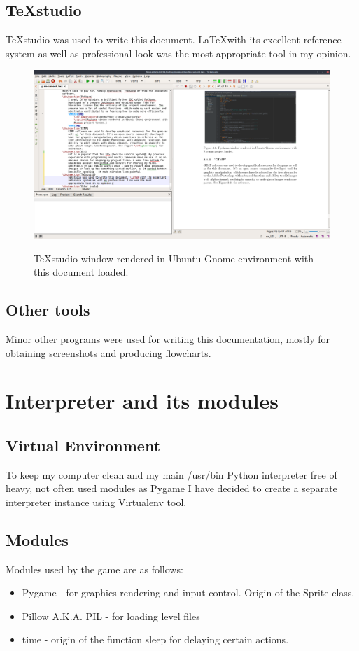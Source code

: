 \documentclass[11pt,a4paper]{report}
\newcommand{\dsubsection}[1]{\FloatBarrier \subsection{#1}}
\newenvironment{img}{
	\begin{center}
		\begin{figure}[H]
			\begin{center}
			
}{
	\end{center}
		\end{figure}
			\end{center}
}
\begin{document}
			\dsubsection{TeXstudio}
				TeXstudio was used to write this document. \LaTeX with its excellent reference system as well as professional look was the most appropriate tool in my opinion.
				\begin{img}
					\includegraphics[width=350pt]{images/texstudio}\\
					\caption{TeXstudio window rendered in Ubuntu Gnome environment with this document loaded.}
				\end{img}
			\dsubsection{Other tools}
				Minor other programs were used for writing this documentation, mostly for obtaining screenshots and producing flowcharts.
		\section{Interpreter and its modules}
			\dsubsection{Virtual Environment}
				To keep my computer clean and my main /usr/bin Python interpreter free of heavy, not often used modules as Pygame I have decided to create a separate interpreter instance using Virtualenv tool.
			\dsubsection{Modules}
				Modules used by the game are as follows:
				\begin{itemize}
					\item Pygame - for graphics rendering and input control. Origin of the Sprite class.
					\item Pillow A.K.A. PIL - for loading level files
					\item time - origin of the function sleep for delaying certain actions.
				\end{itemize}
\end{document}
